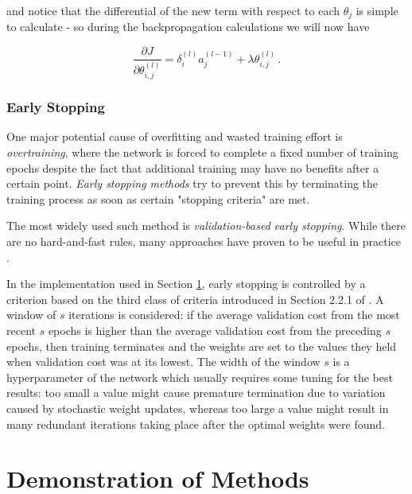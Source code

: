 \documentclass{article}[11pt]
\begin{document}
            and notice that the differential of the new term with respect to each $\theta_j$ is simple to calculate - so during the backpropagation calculations we will now have
            
            $$
            \frac{\partial J}{\partial \theta^{(l)}_{i,j}} = \delta^{(l)}_i a^{(l-1)}_j + \lambda \theta^{(l)}_{i,j} \,.
            $$
            
        
        \subsubsection{Early Stopping}
            
            One major potential cause of overfitting and wasted training effort is \textit{overtraining}, where the network is forced to complete a fixed number of training epochs despite the fact that additional training may have no benefits after a certain point. \textit{Early stopping methods} try to prevent this by terminating the training process as soon as certain "stopping criteria" are met.
            
            The most widely used such method is \textit{validation-based early stopping}. While there are no hard-and-fast rules, many approaches have proven to be useful in practice \cite{early_stopping}.
            
            In the implementation used in Section \ref{sec:demos}, early stopping is controlled by a criterion based on the third class of criteria introduced in Section 2.2.1 of \cite{early_stopping}. A window of $s$ iterations is considered: if the average validation cost from the most recent $s$ epochs is higher than the average validation cost from the preceding $s$ epochs, then training terminates and the weights are set to the values they held when validation cost was at its lowest. The width of the window $s$ is a hyperparameter of the network which usually requires some tuning for the best results: too small a value might cause premature termination due to variation caused by stochastic weight updates, whereas too large a value might result in many redundant iterations taking place after the optimal weights were found.
            
            
            
            



\section{Demonstration of Methods} \label{sec:demos}
\end{document}
